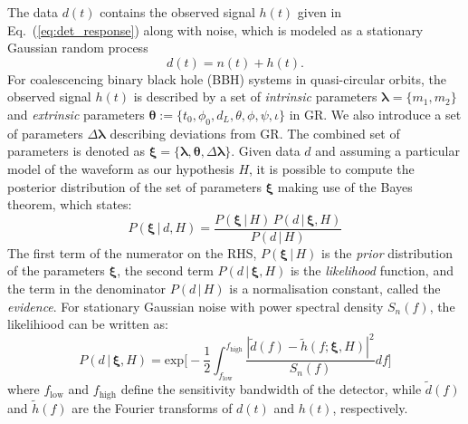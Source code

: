 \documentclass[prl,preprintnumbers,twocolumn,eqsecnum,floatfix,a4paper,nofootinbib,superscriptaddress]{revtex4}
\newcommand{\blambda}{\bm{\lambda}}
\newcommand{\btheta}{\bm{\theta}}
\newcommand{\bxi}{\bm{\xi}}
\begin{document}
The data $d(t)$ contains the observed signal $h(t)$ given in Eq.~(\ref{eq:det_response}) along with noise, which is modeled as a stationary Gaussian random process 
\begin{equation}
d(t) = n(t) + h(t). 
\label{eq:detector_strain}
\end{equation}
For coalescencing binary black hole (BBH) systems in quasi-circular orbits, the observed signal $h(t)$ is described by a set of \emph{intrinsic} parameters $\blambda = \{m_1, m_2\}$ and \emph{extrinsic} parameters  $\btheta := \{t_0, \phi_0, d_L, \theta, \phi, \psi, \iota\}$ in GR. We also introduce a set of parameters $\Delta \blambda$ describing deviations from GR. The combined set of parameters is denoted as $\bxi = \{\blambda, \btheta, \Delta \blambda\}$.  Given data $d$ and assuming a particular model of the waveform as our hypothesis $H$, it is possible to compute the posterior distribution of the set of parameters ${\bxi}$ making use of the Bayes theorem, which states: 
\begin{equation}
P({\bxi} \, | \, d, H) = \frac{P({\bxi} \, | \, H) \, P (d \, | \, {\bxi}, H)}{P(d \, | \, H)}
\label{eq:Bayes_theorem}
\end{equation} 
The first term of the numerator on the RHS, $P({\bxi} \, | \, H)$ is the \emph{prior} distribution of the parameters ${\bxi}$, the second term $P (d \, | \, {\bxi}, H)$ is the \emph{likelihood} function, and the term in the denominator $P(d \, | \, H)$ is a normalisation constant, called the \emph{evidence}. For stationary Gaussian noise with power spectral density $S_n(f)$, the likelihiood can be written as:
\begin{equation}
P (d \, | \, {\bxi}, H) = \text{exp}\Big[ -\frac{1}{2}\int_{f_\mathrm{low}}^{f_\mathrm{high}} \frac{|\tilde{d}(f) - \tilde{h}(f;{\bxi}, H)|^2}{S_n(f)}df\Big]
\end{equation}
where $f_\mathrm{low}$ and $f_\mathrm{high}$ define the sensitivity bandwidth of the detector, while $\tilde{d}(f)$ and $\tilde{h}(f)$ are the Fourier transforms of $d(t)$ and $h(t)$, respectively. 
\end{document}
